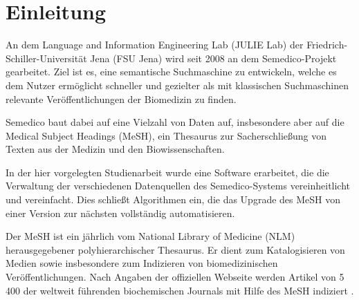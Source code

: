 \section{Einleitung}

An dem Language and Information Engineering Lab (JULIE Lab) der Friedrich-Schiller-Universität Jena (FSU Jena) wird seit 2008 an dem Semedico-Projekt gearbeitet. Ziel ist es, eine semantische Suchmaschine zu entwickeln, welche es dem Nutzer ermöglicht schneller und gezielter als mit klassischen Suchmaschinen relevante Veröffentlichungen der Biomedizin zu finden.




Semedico baut dabei auf eine Vielzahl von Daten auf, insbesondere aber auf die Medical Subject Headings (MeSH), ein Thesaurus zur Sacherschließung von Texten aus der Medizin und den Biowissenschaften. \par

In der hier vorgelegten Studienarbeit wurde eine Software erarbeitet, die die Verwaltung der verschiedenen Datenquellen des Semedico-Systems vereinheitlicht und vereinfacht. Dies schließt Algorithmen ein, die das Upgrade des MeSH von einer Version zur nächsten vollständig automatisieren. \par 


Der MeSH ist ein jährlich vom National Library of Medicine (NLM) herausgegebener polyhierarchischer Thesaurus. Er dient zum Katalogisieren von Medien sowie insbesondere zum Indizieren von biomedizinischen Veröffentlichungen. Nach Angaben der offiziellen Webseite werden Artikel von 5\,400 der weltweit führenden biochemischen Journals mit Hilfe des MeSH indiziert \cite{MeSHWeb2012}. \par

